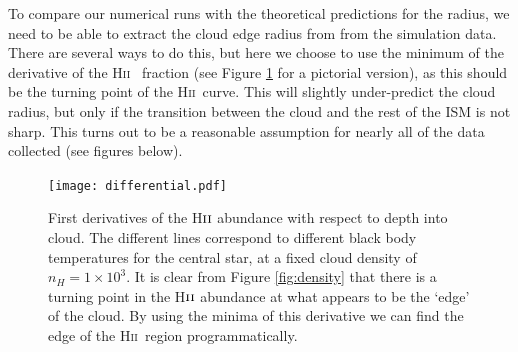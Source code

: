 \documentclass[a4paper]{article}
\newcommand{\hii}{H\textsc{ii}~}
\newcommand{\cloudy}{{\tt CLOUDY}~}
\begin{document}
\begin{table}[!h]
    \centering
    \caption{\small The runs presented below. Note that $S_*$ refers to the number of
        \emph{ionising} photons, i.e. this is {\tt q(h)} in the \cloudy code.}
    \label{tab:sims}
\end{table}
To compare our numerical runs with the theoretical predictions for the
\citet{stromgren_physical_1939} radius, we need to be able to extract the
cloud edge radius from from the simulation data. There are several ways to do
this, but here we choose to use the minimum of the derivative of the \hii
fraction (see Figure \ref{fig:derivative} for a pictorial version), as this
should be the turning point of the \hii curve. This will slightly
under-predict the cloud radius, but only if the transition between the cloud
and the rest of the ISM is not sharp. This turns out to be a reasonable
assumption for nearly all of the data collected (see figures below).

\begin{figure}[!h]
    \centering
    \texttt{[image: differential.pdf]}
    \caption{\small First derivatives of the H$\textsc{ii}$ abundance with respect to
        depth into cloud. The different lines correspond to different black
        body temperatures for the central star, at a fixed cloud density of
        $n_H = 1\times 10^3$. It is clear from Figure \ref{fig:density} that
        there is a turning point in the H$\textsc{ii}$ abundance at what
        appears to be the `edge' of the cloud. By using the minima of this
        derivative we can find the edge of the \hii region programmatically.}
    \label{fig:derivative}
\end{figure}
\end{document}
